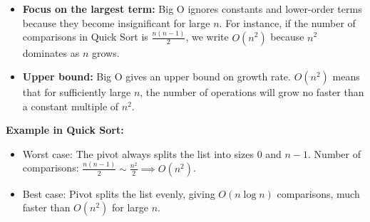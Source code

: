 \begin{enumerate}
\begin{itemize}
{\begin{itemize}
    \item \textbf{Focus on the largest term:} Big O ignores constants and lower-order terms because they become insignificant for large $n$. For instance, if the number of comparisons in Quick Sort is $\frac{n(n-1)}{2}$, we write $O(n^2)$ because $n^2$ dominates as $n$ grows.
    
    \item \textbf{Upper bound:} Big O gives an upper bound on growth rate. $O(n^2)$ means that for sufficiently large $n$, the number of operations will grow no faster than a constant multiple of $n^2$.
\end{itemize}

\textbf{Example in Quick Sort:}
\begin{itemize}
    \item Worst case: The pivot always splits the list into sizes $0$ and $n-1$. Number of comparisons: $\frac{n(n-1)}{2} \sim \frac{n^2}{2} \implies O(n^2)$.
    \item Best case: Pivot splits the list evenly, giving $O(n \log n)$ comparisons, much faster than $O(n^2)$ for large $n$.
\end{itemize}

}
\end{itemize}

\end{enumerate}



